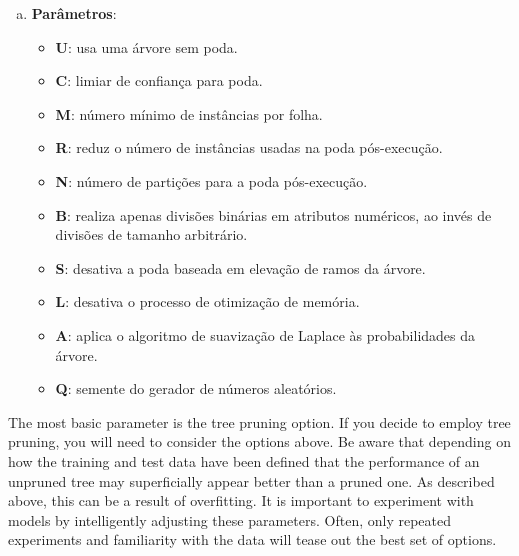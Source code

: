 \begin{enumerate}[a)]
    \item \textbf{Parâmetros}:
        \begin{itemize}

            \item \textbf{U}: usa uma árvore sem poda.

            \item \textbf{C}: limiar de confiança para poda.

            \item \textbf{M}: número mínimo de instâncias por folha.

            \item \textbf{R}: reduz o número de instâncias usadas na poda pós-execução.

            \item \textbf{N}: número de partições para a poda pós-execução.

            \item \textbf{B}: realiza apenas divisões binárias em atributos numéricos, ao invés de divisões de tamanho arbitrário.

            \item \textbf{S}: desativa a poda baseada em elevação de ramos da árvore.

            \item \textbf{L}: desativa o processo de otimização de memória.

            \item \textbf{A}: aplica o algoritmo de suavização de Laplace às probabilidades da árvore.

            \item \textbf{Q}: semente do gerador de números aleatórios.
        \end{itemize}
\end{enumerate}

\iffalse

The most basic parameter is the tree pruning option. If you decide to employ tree pruning, you will need to consider the options above. Be aware that depending on how the training and test data have been defined that the performance of an unpruned tree may superficially appear better than a pruned one. As described above, this can be a result of overfitting. It is important to experiment with models by intelligently adjusting these parameters. Often, only repeated experiments and familiarity with the data will tease out the best set of options.

